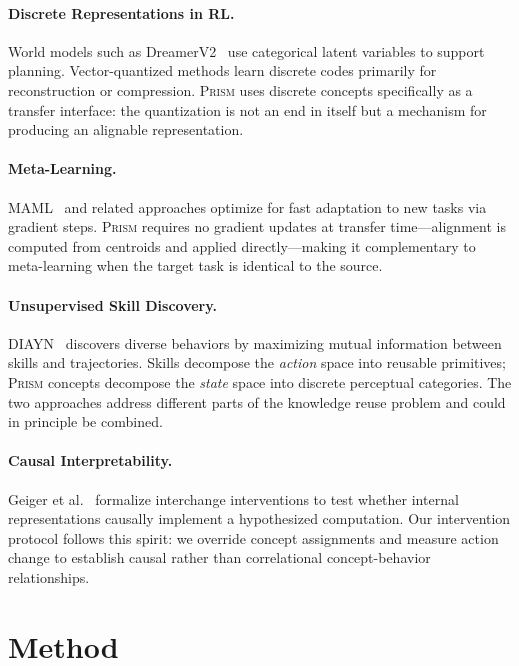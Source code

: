 \documentclass[11pt,a4paper]{article}
\newcommand{\prism}{\textsc{Prism}}
\begin{document}
\paragraph{Discrete Representations in RL.}
World models such as DreamerV2~\citep{hafner2021mastering} use categorical latent variables to support planning. Vector-quantized methods learn discrete codes primarily for reconstruction or compression. \prism{} uses discrete concepts specifically as a transfer interface: the quantization is not an end in itself but a mechanism for producing an alignable representation.

\paragraph{Meta-Learning.}
MAML~\citep{finn2017model} and related approaches optimize for fast adaptation to new tasks via gradient steps. \prism{} requires no gradient updates at transfer time---alignment is computed from centroids and applied directly---making it complementary to meta-learning when the target task is identical to the source.

\paragraph{Unsupervised Skill Discovery.}
DIAYN~\citep{eysenbach2019diversity} discovers diverse behaviors by maximizing mutual information between skills and trajectories. Skills decompose the \emph{action} space into reusable primitives; \prism{} concepts decompose the \emph{state} space into discrete perceptual categories. The two approaches address different parts of the knowledge reuse problem and could in principle be combined.

\paragraph{Causal Interpretability.}
Geiger et al.~\citep{geiger2021causal} formalize interchange interventions to test whether internal representations causally implement a hypothesized computation. Our intervention protocol follows this spirit: we override concept assignments and measure action change to establish causal rather than correlational concept-behavior relationships.

\section{Method}
\label{sec:method}
\end{document}
